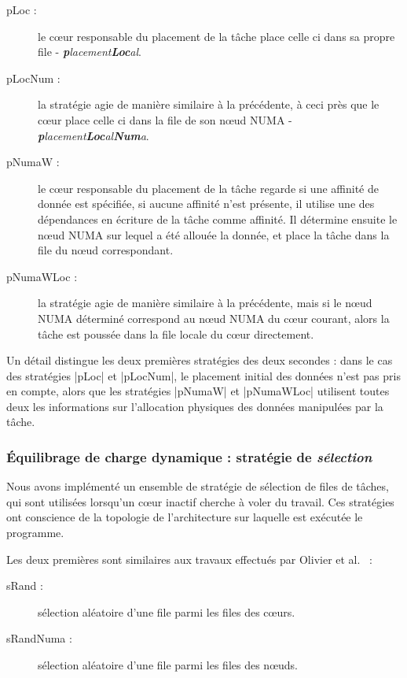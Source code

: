 \begin{description}
  \item [pLoc :] le cœur responsable du placement de la tâche place celle ci dans sa propre file - \emph{\textbf{p}lacement\textbf{Loc}al}.
  \item [pLocNum :] la stratégie agie de manière similaire à la précédente, à ceci près que le cœur place celle ci dans la file de son nœud NUMA - \emph{\textbf{p}lacement\textbf{Loc}al\textbf{Num}a}.
  \item [pNumaW :] le cœur responsable du placement de la tâche regarde si une affinité de donnée est spécifiée, si aucune affinité n'est présente, il utilise une des dépendances en écriture de la tâche comme affinité.
Il détermine ensuite le nœud NUMA sur lequel a été allouée la donnée, et place la tâche dans la file du nœud correspondant.
  \item [pNumaWLoc :] la stratégie agie de manière similaire à la précédente, mais si le nœud NUMA déterminé correspond au nœud NUMA du cœur courant, alors la tâche est poussée dans la file locale du cœur directement.
\end{description}

Un détail distingue les deux premières stratégies des deux secondes : dans le cas des stratégies |pLoc| et |pLocNum|, le placement initial des données n'est pas pris en compte, alors que les stratégies |pNumaW| et |pNumaWLoc| utilisent toutes deux les informations sur l'allocation physiques des données manipulées par la tâche.

\subsubsection{Équilibrage de charge dynamique : stratégie de \emph{sélection}}
\label{sec:openmp:runtime:select}


Nous avons implémenté un ensemble de stratégie de sélection de files de tâches, qui sont utilisées lorsqu'un cœur inactif cherche à voler du travail. Ces stratégies ont conscience de la topologie de l'architecture sur laquelle est exécutée le programme.

Les deux premières sont similaires aux travaux effectués par Olivier et al.~\cite{Olivier2012} :
\begin{description}
  \item [sRand :] sélection aléatoire d'une file parmi les files des cœurs.
  \item [sRandNuma :] sélection aléatoire d'une file parmi les files des nœuds.
\end{description}

